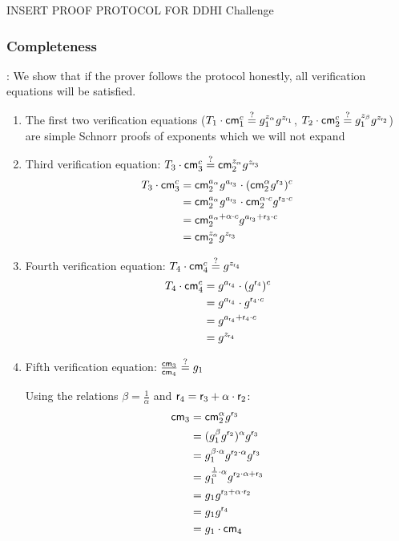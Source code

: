 INSERT PROOF PROTOCOL FOR DDHI Challenge

\subsubsection*{Completeness}:
We show that if the prover follows the protocol honestly, all verification equations will be satisfied.

\begin{enumerate}
    \item The first two verification equations ($T_1 \cdot \mathsf{cm}_1^c \stackrel{?}{=} g_1^{z_\alpha} g^{z_{\mathsf{r}_1}}$, $T_2 \cdot \mathsf{cm}_2^c \stackrel{?}{=} g_1^{z_\beta} g^{z_{\mathsf{r}_2}}$) are simple Schnorr proofs of exponents which we will not expand 
        
    \item Third verification equation: $T_3 \cdot \mathsf{cm}_3^c \stackrel{?}{=} \mathsf{cm}_2^{z_\alpha} g^{z_{\mathsf{r}_3}}$
    \begin{align*}
        T_3 \cdot \mathsf{cm}_3^c &= \mathsf{cm}_2^{a_\alpha} g^{a_{\mathsf{r}_3}} \cdot (\mathsf{cm}_2^\alpha g^{\mathsf{r}_3})^c \\
        &= \mathsf{cm}_2^{a_\alpha} g^{a_{\mathsf{r}_3}} \cdot \mathsf{cm}_2^{\alpha \cdot c} g^{\mathsf{r}_3 \cdot c} \\
        &= \mathsf{cm}_2^{a_\alpha + \alpha \cdot c} g^{a_{\mathsf{r}_3} + \mathsf{r}_3 \cdot c} \\
        &= \mathsf{cm}_2^{z_\alpha} g^{z_{\mathsf{r}_3}}
    \end{align*}
    
    \item Fourth verification equation: $T_4 \cdot \mathsf{cm}_4^c \stackrel{?}{=} g^{z_{\mathsf{r}_4}}$
    \begin{align*}
        T_4 \cdot \mathsf{cm}_4^c &= g^{a_{\mathsf{r}_4}} \cdot (g^{\mathsf{r}_4})^c \\
        &= g^{a_{\mathsf{r}_4}} \cdot g^{\mathsf{r}_4 \cdot c} \\
        &= g^{a_{\mathsf{r}_4} + \mathsf{r}_4 \cdot c} \\
        &= g^{z_{\mathsf{r}_4}}
    \end{align*}
    
    \item Fifth verification equation: $\frac{\mathsf{cm}_3}{\mathsf{cm}_4} \stackrel{?}{=} g_1$
    
    Using the relations $\beta = \frac{1}{\alpha}$ and $\mathsf{r}_4 = \mathsf{r}_3 + \alpha \cdot \mathsf{r}_2$:
    \begin{align*}
        \mathsf{cm}_3 &= \mathsf{cm}_2^\alpha g^{\mathsf{r}_3} \\
        &= (g_1^\beta g^{\mathsf{r}_2})^\alpha g^{\mathsf{r}_3} \\
        &= g_1^{\beta \cdot \alpha} g^{\mathsf{r}_2 \cdot \alpha} g^{\mathsf{r}_3} \\
        &= g_1^{\frac{1}{\alpha} \cdot \alpha} g^{\mathsf{r}_2 \cdot \alpha + \mathsf{r}_3} \\
        &= g_1 g^{\mathsf{r}_3 + \alpha \cdot \mathsf{r}_2} \\
        &= g_1 g^{\mathsf{r}_4} \\
        &= g_1 \cdot \mathsf{cm}_4
    \end{align*}
    

\end{enumerate}
